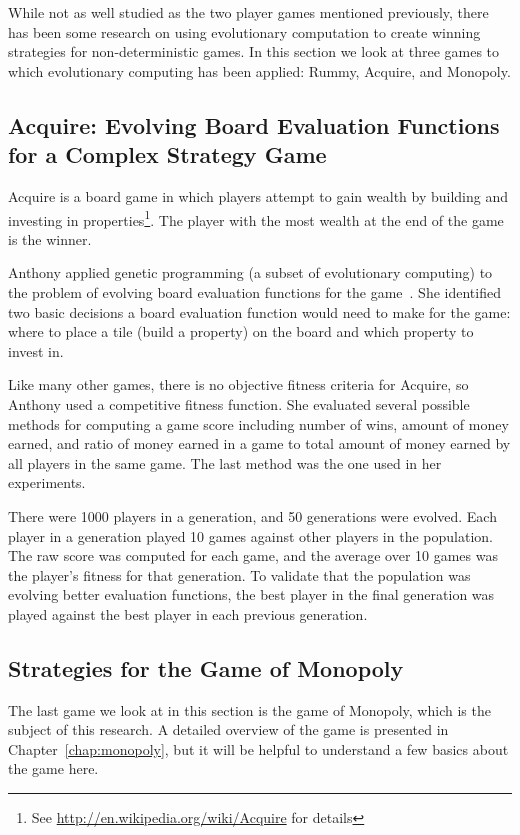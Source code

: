 While not as well studied as the two player games mentioned previously, there
has been some research on using evolutionary computation to create winning
strategies for non-deterministic games. In this section we look at three games
to which evolutionary computing has been applied: Rummy, Acquire, and Monopoly.

\subsection{Acquire: Evolving Board Evaluation Functions for a Complex Strategy
Game}

Acquire is a board game in which players attempt to gain wealth by building and
investing in properties\footnote{See \url{http://en.wikipedia.org/wiki/Acquire}
for details}. The player with the most wealth at the end of the game is the
winner.

Anthony applied genetic programming (a subset of evolutionary computing) to the
problem of evolving board evaluation functions for the game~\cite{Anthony2002}.
She identified two basic decisions a board evaluation function would need to
make for the game: where to place a tile (build a property) on the board and
which property to invest in. 

Like many other games, there is no objective fitness criteria for Acquire, so
Anthony used a competitive fitness function. She evaluated several possible
methods for computing a game score including number of wins, amount of money
earned, and ratio of money earned in a game to total amount of money earned by
all players in the same game. The last method was the one used in her
experiments.

There were 1000 players in a generation, and 50 generations were evolved. Each
player in a generation played 10 games against other players in the population.
The raw score was computed for each game, and the average over 10 games was the
player's fitness for that generation. To validate that the population was
evolving better evaluation functions, the best player in the final generation
was played against the best player in each previous generation.

\subsection{Strategies for the Game of Monopoly}

The last game we look at in this section is the game of Monopoly, which is the
subject of this research. A detailed overview of the game is presented in
Chapter~\ref{chap:monopoly}, but it will be helpful to understand a few basics
about the game here. 

